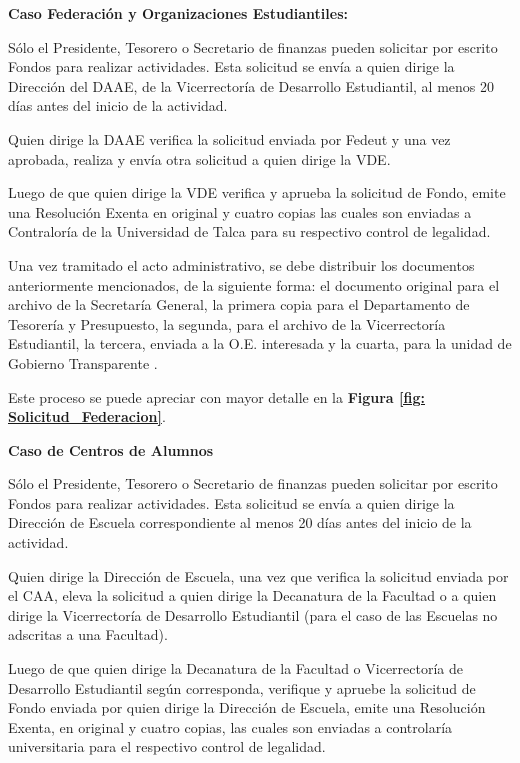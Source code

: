 \begin{tasks}[counter-format = {tsk[A].}]
	\task \textbf{Caso Federación y Organizaciones Estudiantiles:}

	Sólo el Presidente, Tesorero o Secretario de finanzas pueden solicitar por escrito Fondos para realizar actividades. Esta solicitud se envía a quien dirige la Dirección del DAAE, de la Vicerrectoría de Desarrollo Estudiantil, al menos 20 días antes del inicio de la actividad. 

	Quien dirige la DAAE verifica la solicitud enviada por Fedeut y una vez aprobada, realiza y envía otra solicitud a quien dirige la VDE.

	Luego de que quien dirige la VDE verifica y aprueba la solicitud de Fondo, emite una Resolución Exenta en original y cuatro copias las cuales son enviadas a Contraloría de la Universidad de Talca para su respectivo control de legalidad. 
	
	Una vez tramitado el acto administrativo, se debe distribuir los documentos anteriormente mencionados, de la siguiente forma: el documento original para el archivo de la Secretaría General, la primera copia para el Departamento de Tesorería y Presupuesto, la segunda, para el archivo de la Vicerrectoría Estudiantil, la tercera, enviada a la O.E. interesada y la cuarta, para la unidad de Gobierno Transparente .

	Este proceso se puede apreciar con mayor detalle en la \textbf{Figura \ref{fig: Solicitud_Federacion}}.

	\task \textbf{Caso de Centros de Alumnos}

	Sólo el Presidente, Tesorero o Secretario de finanzas pueden solicitar por escrito Fondos para realizar actividades. Esta solicitud se envía a quien dirige la Dirección de Escuela correspondiente al menos 20 días antes del inicio de la actividad. 

	Quien dirige la Dirección de Escuela, una vez que verifica la solicitud enviada por el CAA, eleva la solicitud a quien dirige la Decanatura de la Facultad o a quien dirige la Vicerrectoría de Desarrollo Estudiantil (para el caso de las Escuelas no adscritas a una Facultad).

	Luego de que quien dirige la Decanatura de la Facultad o Vicerrectoría de Desarrollo Estudiantil según corresponda, verifique y apruebe la solicitud de Fondo enviada por quien dirige la Dirección de Escuela, emite una Resolución Exenta, en original y cuatro copias, las cuales son enviadas a controlaría universitaria para el respectivo control de legalidad.


\end{tasks}
